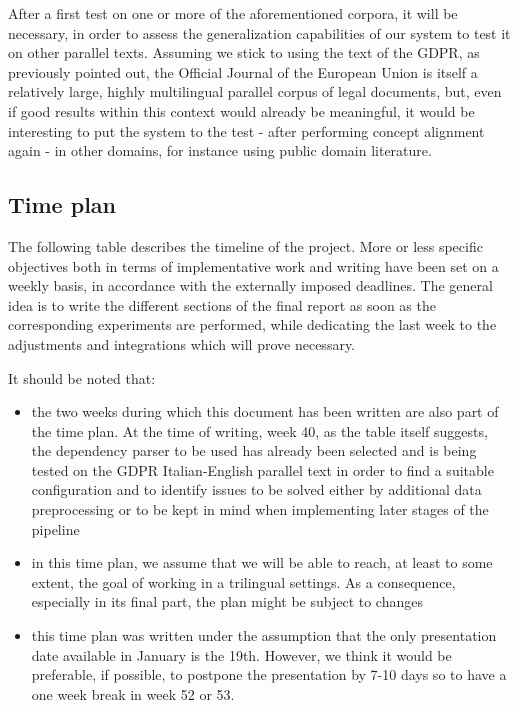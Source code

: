 \documentclass{article}
\begin{document}
After a first test on one or more of the aforementioned corpora, it will be necessary, in order to assess the generalization capabilities of our system to test it on other parallel texts. 
Assuming we stick to using the text of the GDPR, as previously pointed out, the Official Journal of the European Union is itself a relatively large, highly multilingual parallel corpus of legal documents, but, even if good results within this context would already be meaningful, it would be interesting to put the system to the test - after performing concept alignment again - in other domains, for instance using public domain literature.

\subsection{Time plan} \label{timeline}
The following table describes the timeline of the project. More or less specific objectives both in terms of implementative work and writing have been set on a weekly basis, in accordance with the externally imposed deadlines. The general idea is to write the different sections of the final report as soon as the corresponding experiments are performed, while dedicating the last week to the adjustments and integrations which will prove necessary. 

It should be noted that:
\begin{itemize}
    \item the two weeks during which this document has been written are also part of the time plan. At the time of writing, week 40, as the table itself suggests, the dependency parser to be used has already been selected and is being tested on the GDPR Italian-English parallel text in order to find a suitable configuration and to identify issues to be solved either by additional data preprocessing or to be kept in mind when implementing later stages of the pipeline
    \item in this time plan, we assume that we will be able to reach, at least to some extent, the goal of working in a trilingual settings. As a consequence, especially in its final part, the plan might be subject to changes
    \item this time plan was written under the assumption that the only presentation date available in January is the 19th. However, we think it would be preferable, if possible, to postpone the presentation by 7-10 days so to have a one week break in week 52 or 53.
\end{itemize}
\end{document}
